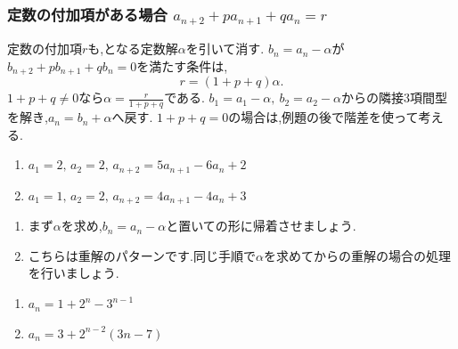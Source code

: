 \subsubsection{\texorpdfstring{定数の付加項がある場合  $a_{n+2}+pa_{n+1}+qa_n=r$}{定数の付加項がある場合}}\label{節：定数の付加項がある場合}
定数の付加項$r$も,となる定数解$\alpha$を引いて消す.
$b_n=a_n-\alpha$が$b_{n+2}+pb_{n+1}+qb_n=0$を満たす条件は,
\[
  r=(1+p+q)\alpha.
\]
$1+p+q\ne0$なら$\alpha=\frac{r}{1+p+q}$である.
$b_1=a_1-\alpha,\ b_2=a_2-\alpha$からの隣接3項間型を解き,$a_n=b_n+\alpha$へ戻す.
$1+p+q=0$の場合は,例題の後で階差を使って考える.

\noindent {}\par\nobreak
\begin{enumerate}[label=(\arabic*),parsep=3pt,format=\bookitemlink{example-three-term-2}{problem}{hint}]
  \item $a_1=2,\,a_2=2,\, a_{n+2}=5a_{n+1}-6a_n+2$
  \item $a_1=1,\,a_2=2,\, a_{n+2}=4a_{n+1}-4a_n+3$
\end{enumerate}

\noindent{}\par\nobreak
\begin{enumerate}[label=(\arabic*),parsep=3pt,format=\bookitemlink{example-three-term-2}{hint}{answer}]
  \item まず$\alpha$を求め,$b_n=a_n-\alpha$と置いての形に帰着させましょう.
  \item こちらは重解のパターンです.同じ手順で$\alpha$を求めてからの重解の場合の処理を行いましょう.
\end{enumerate}

\noindent{}\par\nobreak
\begin{enumerate}[label=(\arabic*),parsep=3pt,format=\bookitemlink{example-three-term-2}{answer}{solution}]
  \item $a_n=1+2^n-3^{n-1}$
  \item $a_n=3+2^{n-2}(3n-7)$
\end{enumerate}

